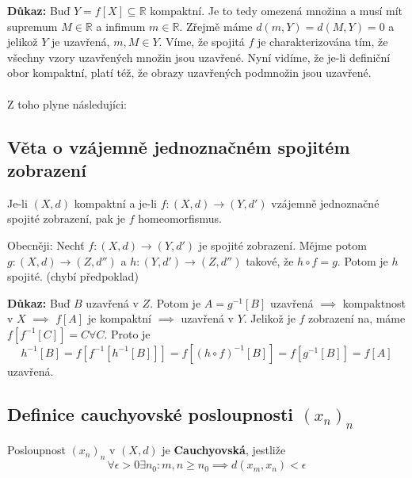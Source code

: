 \documentclass[../main.tex]{subfiles}
\begin{document}
\vspace{5mm}
\noindent
\textbf{Důkaz:} Buď $Y = f[X] \subseteq \mathbb{R}$ kompaktní. Je to tedy omezená množina a musí mít supremum $M\in \mathbb{R}$ a infimum $m\in \mathbb{R}$. Zřejmě máme 
$d(m,Y) = d(M,Y) = 0$ a jelikož $Y$ je uzavřená, $m,M \in Y$. Víme, že spojitá $f$ je charakterizována tím, že všechny vzory uzavřených množin
jsou uzavřené. Nyní vidíme, že je-li definiční obor kompaktní, platí též, že obrazy uzavřených podmnožin jsou uzavřené. 
\\
\\
Z toho plyne následujíci:

\subsection{Věta o vzájemně jednoznačném spojitém zobrazení}
\hspace{1.2mm}
\noindent
Je-li $(X,d)$ kompaktní a je-li $f: (X,d) \to (Y,d')$ vzájemně jednoznačné spojité zobrazení, pak je
$f$ homeomorfismus.

\vspace{2mm}
\hspace{1.2mm}
{\small
Obecněji: Nechť $f:(X,d) \to (Y,d')$ je spojité zobrazení. Mějme potom $g: (X,d) \to (Z, d'')$ a
$h: (Y,d') \to (Z,d'')$ takové, že $h \circ f = g$. Potom je $h$ spojité. (chybí předpoklad)}

\vspace{5mm}
\noindent
\textbf{Důkaz:} Buď $B$ uzavřená v $Z$. Potom je $A = g^{-1}[B]$ uzavřená $\implies$ kompaktnost v $X$ $\implies$ $f[A]$ je kompaktní $\implies$ uzavřená v $Y$. Jelikož  je $f$ zobrazení na, máme $f[f^{-1}[C]] = C \forall C$. Proto je 
\[h^{-1}[B] = f[f^{-1}[h^{-1}[B]]] = f[(h \circ f)^{-1}[B]] = f[g^{-1}[B]] = f[A]\]
uzavřená.

\subsection{Definice cauchyovské posloupnosti $(x_n)_n$}
\hspace{1.2mm}
\noindent
Posloupnost $(x_n)_n$ v $(X,d)$ je \textbf{Cauchyovská}, jestliže
\[ \forall \epsilon > 0 \exists n_0: m,n \geq n_0 \implies d(x_m, x_n) < \epsilon \]

\end{document}
